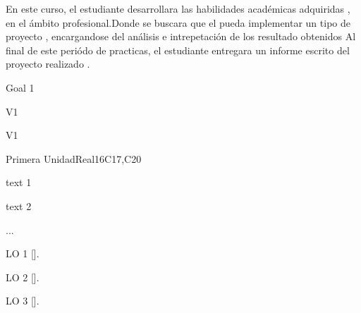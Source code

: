 \begin{syllabus}


\begin{justification}
En este curso, el estudiante desarrollara las habilidades académicas adquiridas , en el ámbito profesional.Donde se buscara que el pueda implementar un tipo de proyecto , encargandose del análisis  e intrepetación de los resultado obtenidos 
Al final de este periódo de practicas, el estudiante entregara un informe escrito del proyecto realizado .
\end{justification}

\begin{goals}
\item Goal 1
\end{goals}

\begin{outcomes}{V1}
   \item {}
   \item {}
   \item {}
\end{outcomes}

\begin{competences}{V1}
    \item {}
    \item {}
    \item {}
\end{competences}

\begin{unit}{}{Primera Unidad}{Real}{16}{C17,C20}
\begin{topics}
      \item text 1
      \item text 2
      \item ...
\end{topics}

\begin{learningoutcomes}
   \item LO 1 [\Usage].
   \item LO 2 [\Usage].
   \item LO 3 [\Usage].
\end{learningoutcomes}
\end{unit}

\begin{coursebibliography}
\end{coursebibliography}

\end{syllabus}
